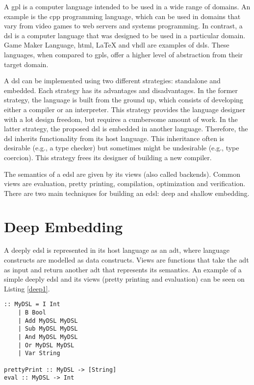 A \ac{gpl} is a computer language intended to be used in a wide range of domains. An example is the \gls{cpp} programming language, which can be used in domains that vary from video games to web servers and systems programming. In contrast, a \acf{dsl} is a computer language that was designed to be used in a particular domain. Game Maker Language, \acs{html}, LaTeX and \acs{vhdl} are examples of \acp{dsl}. These languages, when compared to \acp{gpl}, offer a higher level of abstraction from their target domain.

A \ac{dsl} can be implemented using two different strategies: standalone and embedded. Each strategy has its advantages and disadvantages. In the former strategy, the language is built from the ground up, which consists of developing either a compiler or an interpreter. This strategy provides the language designer with a lot design freedom, but requires a cumbersome amount of work. In the latter strategy, the proposed \ac{dsl} is embedded in another language. Therefore, the \ac{dsl} inherits functionality from its host language. This inheritance often is desirable (e.g., a type checker) but sometimes might be undesirable (e.g., type coercion). This strategy frees its designer of building a new compiler.

The semantics of a \acf{edsl} are given by its views (also called backends). Common views are evaluation, pretty printing, compilation, optimization and verification. There are two main techniques for building an \ac{edsl}: deep and shallow embedding.

\section{Deep Embedding}

A deeply \ac{edsl} is represented in its host language as an \ac{adt}, where language constructs are modelled as data constructs. Views are functions that take the \ac{adt} as input and return another \ac{adt} that represents its semantics. An example of a simple deeply \ac{edsl} and its views (pretty printing and evaluation) can be seen on Listing \ref{deep1}.


\begin{lstlisting}[caption=A simple deeply \ac{edsl} and its views,captionpos=b,label=deep1]
:: MyDSL = I Int
    | B Bool
    | Add MyDSL MyDSL
    | Sub MyDSL MyDSL
    | And MyDSL MyDSL
    | Or MyDSL MyDSL
    | Var String
    
prettyPrint :: MyDSL -> [String]
eval :: MyDSL -> Int
\end{lstlisting}

